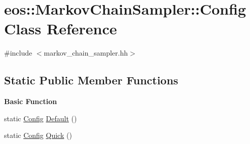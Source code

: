 \hypertarget{classeos_1_1MarkovChainSampler_1_1Config}{
\section{eos::MarkovChainSampler::Config Class Reference}
\label{classeos_1_1MarkovChainSampler_1_1Config}
}


{\ttfamily \#include $<$markov\_\-chain\_\-sampler.hh$>$}\subsection*{Static Public Member Functions}
\begin{Indent}{\bf Basic Function}\par
{\em \label{_amgrp9ac0a05bc9f1ecee9a728c52951f9f43}
 }\begin{DoxyCompactItemize}
\item 
static \hyperlink{classeos_1_1MarkovChainSampler_1_1Config}{Config} \hyperlink{classeos_1_1MarkovChainSampler_1_1Config_a873df585d161c55e45b69fe45def8bd0}{Default} ()
\item 
static \hyperlink{classeos_1_1MarkovChainSampler_1_1Config}{Config} \hyperlink{classeos_1_1MarkovChainSampler_1_1Config_aae4d353bed05e0921697290e7e93f116}{Quick} ()
\end{DoxyCompactItemize}
\end{Indent}
